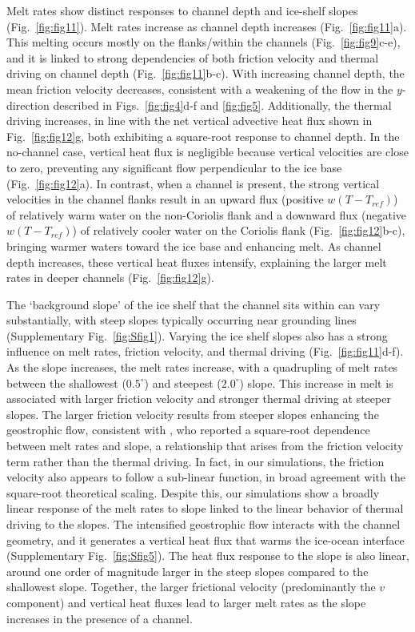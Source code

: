 \documentclass[draft]{agujournal2019}
\begin{document}
Melt rates show distinct responses to channel depth and ice-shelf slopes (Fig.~\ref{fig:fig11}). Melt rates increase as channel depth increases (Fig.~\ref{fig:fig11}a). This melting occurs mostly on the flanks/within the channels (Fig.~\ref{fig:fig9}c-e), and it is linked to strong dependencies of both friction velocity and thermal driving on channel depth (Fig.~\ref{fig:fig11}b-c). 
With increasing channel depth, the mean friction velocity decreases, consistent with a weakening of the flow in the $y$-direction described in Figs.~\ref{fig:fig4}d-f and \ref{fig:fig5}. Additionally, the thermal driving increases, in line with the net vertical advective heat flux shown in Fig.~\ref{fig:fig12}g, both exhibiting a square-root response to channel depth. In the no-channel case, vertical heat flux is negligible because vertical velocities are close to zero, preventing any significant flow perpendicular to the ice base (Fig.~\ref{fig:fig12}a). In contrast, when a channel is present, the strong vertical velocities in the channel flanks result in an upward flux (positive $w(T-T_{ref})$) of relatively warm water on the non-Coriolis flank and a downward flux (negative $w(T-T_{ref})$) of relatively cooler water on the Coriolis flank (Fig.~\ref{fig:fig12}b-c), bringing warmer waters toward the ice base and enhancing melt. As channel depth increases, these vertical heat fluxes intensify, explaining the larger melt rates in deeper channels (Fig.~\ref{fig:fig12}g). 

The `background slope' of the ice shelf that the channel sits within can vary substantially, with steep slopes typically occurring near grounding lines (Supplementary Fig.~\ref{fig:Sfig1}). Varying the ice shelf slopes also has a strong influence on melt rates, friction velocity, and thermal driving (Fig.~\ref{fig:fig11}d-f). As the slope increases, the melt rates increase, with a quadrupling of melt rates between the shallowest ($0.5^\circ$) and steepest ($2.0^\circ$) slope.  This increase in melt is associated with larger friction velocity and stronger thermal driving at steeper slopes. The larger friction velocity results from steeper slopes enhancing the geostrophic flow, consistent with \citet{Anselin_IceBase_2024}, who reported a square‑root dependence between melt rates and slope, a relationship that arises from the friction velocity term rather than the thermal driving. In fact, in our simulations, the friction velocity also appears to follow a sub-linear function, in broad agreement with the square-root theoretical scaling. Despite this, our simulations show a broadly linear response of the melt rates to slope linked to the linear behavior of thermal driving to the slopes. The intensified geostrophic flow interacts with the channel geometry, and it generates a vertical heat flux that warms the ice-ocean interface (Supplementary Fig.~\ref{fig:Sfig5}). The heat flux response to the slope is also linear, around one order of magnitude larger in the steep slopes compared to the shallowest slope. Together, the larger frictional velocity (predominantly the $v$ component) and vertical heat fluxes lead to larger melt rates as the slope increases in the presence of a channel.
\end{document}

